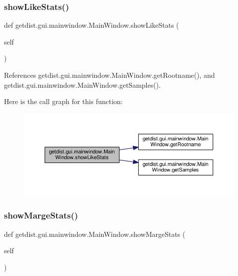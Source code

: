 \subsubsection{\texorpdfstring{show\+Like\+Stats()}{showLikeStats()}}
{\footnotesize\ttfamily def getdist.\+gui.\+mainwindow.\+Main\+Window.\+show\+Like\+Stats (\begin{DoxyParamCaption}\item[{}]{self }\end{DoxyParamCaption})}



References getdist.\+gui.\+mainwindow.\+Main\+Window.\+get\+Rootname(), and getdist.\+gui.\+mainwindow.\+Main\+Window.\+get\+Samples().

Here is the call graph for this function\+:
\nopagebreak
\begin{figure}[H]
\begin{center}
\leavevmode
\includegraphics[width=350pt]{classgetdist_1_1gui_1_1mainwindow_1_1MainWindow_a91b3c81902c45328fe0fa805ba6f06c3_cgraph}
\end{center}
\end{figure}
\mbox{\label{classgetdist_1_1gui_1_1mainwindow_1_1MainWindow_ab2bfcd95456dc31098dd7aeb11530a09}} 
\subsubsection{\texorpdfstring{show\+Marge\+Stats()}{showMargeStats()}}
{\footnotesize\ttfamily def getdist.\+gui.\+mainwindow.\+Main\+Window.\+show\+Marge\+Stats (\begin{DoxyParamCaption}\item[{}]{self }\end{DoxyParamCaption})}

